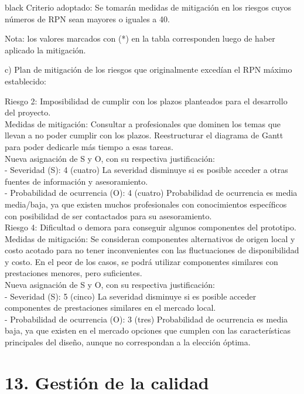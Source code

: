 \documentclass[11pt]{charter}
\begin{document}
\begin{consigna}{black}
Criterio adoptado: 
Se tomarán medidas de mitigación en los riesgos cuyos números de RPN sean mayores o iguales a 40.

Nota: los valores marcados con (*) en la tabla corresponden luego de haber aplicado la mitigación.

c) Plan de mitigación de los riesgos que originalmente excedían el RPN máximo establecido:
 
Riesgo 2: Imposibilidad de cumplir con los plazos planteados para el desarrollo del proyecto.\\
Medidas de mitigación: Consultar a  profesionales que dominen los temas que llevan a no poder cumplir con los plazos. Reestructurar el diagrama de Gantt para poder dedicarle más tiempo a esas tareas.\\
  Nueva asignación de S y O, con su respectiva justificación:\\
  - Severidad (S): 4 (cuatro) La severidad disminuye si es posible acceder a otras fuentes de información y asesoramiento.\\
  - Probabilidad de ocurrencia (O): 4 (cuatro) Probabilidad de ocurrencia es media media/baja, ya que existen muchos profesionales con conocimientos específicos con posibilidad de ser contactados para su asesoramiento.\\ 

Riesgo 4:  Dificultad o demora para conseguir algunos componentes del prototipo.\\
Medidas de mitigación: Se consideran componentes alternativos de origen local y costo acotado para no tener inconvenientes con las fluctuaciones de disponibilidad y costo. En el peor de los casos, se podrá utilizar componentes similares con prestaciones menores, pero suficientes.\\
  Nueva asignación de S y O, con su respectiva justificación:\\
  - Severidad (S): 5 (cinco) La severidad disminuye si es posible acceder componentes de prestaciones similares en el mercado local.\\  
  - Probabilidad de ocurrencia (O): 3 (tres) Probabilidad de ocurrencia es media baja, ya que existen en el mercado opciones que cumplen con las características  principales del diseño, aunque no correspondan a la elección óptima.\\
\end{consigna}
\pagebreak

\section{13. Gestión de la calidad}
\label{sec:calidad}
\end{document}
